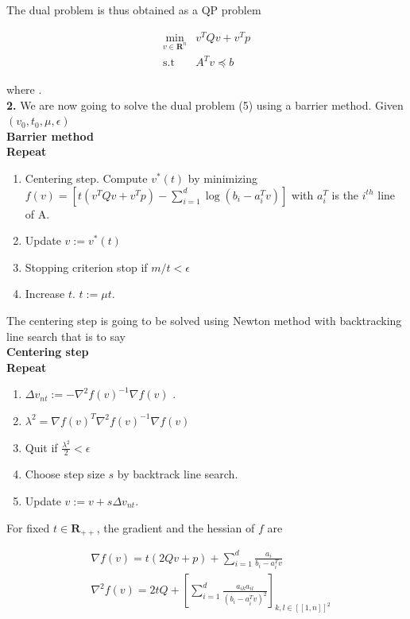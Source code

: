 \documentclass[a4paper, 11pt]{article}
\begin{document}
The dual problem is thus obtained as a QP problem 

\begin{align}
  \min_{v \in \mathbf{R}^{n}} &  v^TQv + v^Tp \\
  \text{s.t} \quad & A^T v \preceq b \nonumber
\end{align}

where . \\

\textbf{2.} We are now going to solve the dual problem (5) using a barrier method. Given $(v_0,t_0,\mu, \epsilon)$ \\

\noindent\textbf{Barrier method} \\
\textbf{Repeat}
\begin{enumerate}
  \item Centering step. Compute $v^*(t)$ by minimizing $f(v) = \left[ t(v^TQv + v^Tp) - \sum_{i=1}^d
    \log(b_i-a_i^Tv)\right]$ with $a_i^T$ is the $i^{th}$ line of A. 
  \item Update $v := v^*(t)$
  \item Stopping criterion stop if $m/t < \epsilon$
  \item Increase $t$. $t := \mu t$.
\end{enumerate}

The centering step is going to be solved using Newton method with backtracking line search that is to say \\

\noindent\textbf{Centering step} \\
\textbf{Repeat}
\begin{enumerate}
  \item $\Delta v_{nt} := -\nabla^2f(v)^{-1}\nabla f(v)$ .
  \item $\lambda^2 = \nabla f(v)^T \nabla^2f(v)^{-1}\nabla f(v)$
  \item Quit if $\frac{\lambda^2}{2} < \epsilon$
  \item Choose step size $s$ by backtrack line search.
  \item Update $v := v + s\Delta v_{nt}$.
\end{enumerate}


For fixed $t \in \mathbf{R}_{++}$, the gradient and the hessian of $f$ are

\begin{align*}
  &\nabla f(v) = t(2Qv + p) + \sum_{i=1}^d \frac{a_i}{b_i-a_i^Tv} \\
  &\nabla^2 f(v) = 2tQ + \left[ \sum_{i=1}^d \frac{a_{ik}a_{il}}{(b_i - a_i^Tv)^2} \right]_{k,l \in [\![1,n]\!]^2}
\end{align*}
\end{document}
